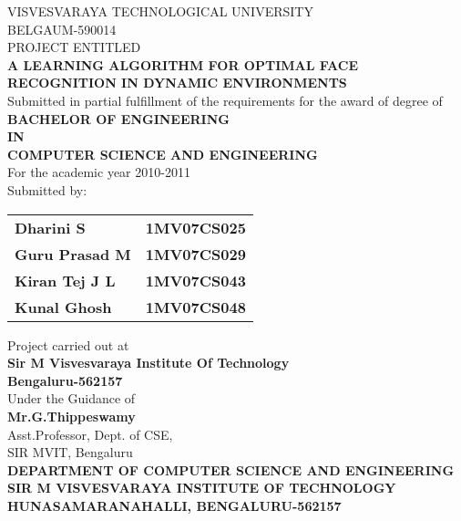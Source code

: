 \documentclass[10pt,a4paper]{article}
\newcommand{\tab}{\hspace*{4 cm}}
\begin{document}
\begin{center}
VISVESVARAYA TECHNOLOGICAL UNIVERSITY \\ BELGAUM-590014 \\
\vspace{5mm}
PROJECT ENTITLED\\
\vspace{5mm}
\textbf{A LEARNING ALGORITHM FOR OPTIMAL FACE RECOGNITION IN DYNAMIC ENVIRONMENTS}\\
\vspace{5mm}
Submitted in partial fulfillment of the requirements for the award of degree of \\
\vspace{5mm}
\textbf{BACHELOR OF ENGINEERING}\\
\textbf{IN}\\
\textbf{COMPUTER SCIENCE AND ENGINEERING}\\
\vspace{5mm}
For the academic year 2010-2011\\
\vspace{5mm}
Submitted by:
\vspace{5mm}
\\
\begin{table}[h]
\begin{tabular}{lr}
\textbf{Dharini S} \tab & \textbf{1MV07CS025}   \\
\textbf{Guru Prasad M} \tab & \textbf{1MV07CS029}   \\
\textbf{Kiran Tej J L}  \tab & \textbf{1MV07CS043}  \\
\textbf{Kunal Ghosh} \tab &  \textbf{1MV07CS048}   \\ 
\end{tabular}
\end{table}
\vspace{5mm}
Project carried out at \\
\vspace{5mm}
\textbf{Sir M Visvesvaraya Institute Of Technology}\\
\vspace{5mm}
\textbf{Bengaluru-562157}\\
\vspace{5mm}
Under the Guidance of\\
\vspace{5mm}
\textbf{Mr.G.Thippeswamy}\\
\vspace{5mm}
Asst.Professor, Dept. of CSE,\\
\vspace{5mm}
SIR MVIT, Bengaluru\\
\vspace{5mm}
\textbf{DEPARTMENT OF COMPUTER SCIENCE AND ENGINEERING}\\
\vspace{2mm}
\textbf{SIR M VISVESVARAYA INSTITUTE OF TECHNOLOGY}\\
\vspace{2mm}
\textbf{HUNASAMARANAHALLI, BENGALURU-562157}\\

\end{center}
\end{document}
